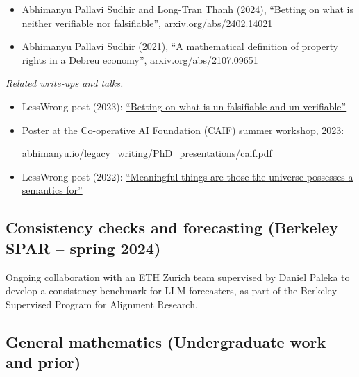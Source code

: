 \documentclass{article}
\newenvironment{relatedwork}
   {
     \begin{mdframed}[
       leftmargin=1cm,
       rightmargin=0cm,
       innerleftmargin=10pt,
       innerrightmargin=0pt,
       innertopmargin=0.5em,
       innerbottommargin=0.5em,
       linewidth=1pt,
       linecolor=gray,
       topline=false,
       bottomline=false,
       rightline=false
     ]
     \footnotesize
   }
   {
     \end{mdframed}
   }
\begin{document}
\begin{itemize}

    \item
          Abhimanyu Pallavi Sudhir and Long-Tran Thanh (2024), ``Betting on what is neither verifiable nor falsifiable'', \href{https://arxiv.org/abs/2402.14021}{arxiv.org/abs/2402.14021}

    \item
          Abhimanyu Pallavi Sudhir (2021),
          ``A mathematical definition of property rights in a Debreu economy'',
          \href{https://arxiv.org/abs/2107.09651}{arxiv.org/abs/2107.09651}

\end{itemize}

\begin{relatedwork}
    \emph{Related write-ups and talks.}
    \begin{itemize}[label=—]
        \item LessWrong post (2023): \href{https://www.lesswrong.com/posts/id84oe3LxdzoqinKA/betting-on-what-is-un-falsifiable-and-un-verifiable}{``Betting on what is un-falsifiable and un-verifiable''}
        \item Poster at the Co-operative AI Foundation (CAIF) summer workshop, 2023:

              \href{https://abhimanyu.io/legacy_writing/PhD_presentations/caif.pdf}{abhimanyu.io/legacy\_writing/PhD\_presentations/caif.pdf}
        \item LessWrong post (2022): \href{https://www.lesswrong.com/posts/xqxXrAohXSD3akYCg/meaningful-things-are-those-the-universe-possesses-a}{``Meaningful things are those the universe possesses a semantics for''}
    \end{itemize}
\end{relatedwork}

\subsection*{Consistency checks and forecasting (Berkeley SPAR -- spring 2024)}

Ongoing collaboration with an ETH Zurich team supervised by Daniel Paleka to develop a consistency benchmark for LLM forecasters, as part of the Berkeley Supervised Program for Alignment Research.

\subsection*{General mathematics (Undergraduate work and prior)}
\end{document}
